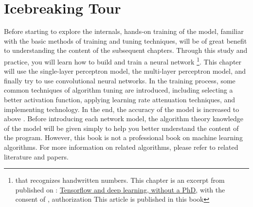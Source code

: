 \begin{savequote}[45mm]
\end{savequote}

\chapter{Icebreaking Tour} 
\label{ch:ice-breaker}
\begin{content}

Before starting to explore the \tf{} internals, hands-on training of the model, familiar with the basic methods of training and tuning techniques, will be of great benefit to understanding the content of the subsequent chapters. Through this study and practice, you will learn how to build and train a neural network \footnote{that recognizes handwritten numbers. This chapter is an excerpt from  published on : \href{https://codelabs.developers.google.com/codelabs/cloud-tensorflow-mnist}{Tensorflow and deep learning, without a PhD}, with the consent of , authorization This article is published in this book}.
This chapter will use the single-layer perceptron model, the multi-layer perceptron model, and finally try to use convolutional neural networks. In the training process, some common techniques of algorithm tuning are introduced, including selecting a better activation function, applying learning rate attenuation techniques, and implementing  technology. In the end, the accuracy of the model is increased to above .
Before introducing each network model, the algorithm theory knowledge of the model will be given simply to help you better understand the content of the program. However, this book is not a professional book on machine learning algorithms. For more information on related algorithms, please refer to related literature and papers.
\end{content}


